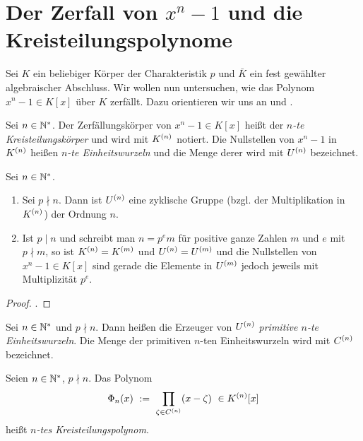 \chapter{Der Zerfall von $x^n-1$ und die Kreisteilungspolynome}
\label{chap:kreisteilungspolynome}

Sei $K$ ein beliebiger Körper der Charakteristik $p$ 
und $\bar K$ ein fest gewählter algebraischer
Abschluss. Wir wollen nun untersuchen, wie das Polynom
$x^n-1 \in K[x]$ über $K$ zerfällt. Dazu orientieren wir uns 
an \autocite{lidl1997finite} und \autocite{wan2003lectures}.

\begin{definition}
  \label{def:kreisteilungskorper}
  Sei $n\in\mathbb{N}^\ast$. Der Zerfällungskörper von $x^n-1 \in K[x]$ heißt
  der \emph{$n$-te Kreisteilungskörper} und wird mit $K^{(n)}$ notiert.
  Die Nullstellen von $x^n-1$ in $K^{(n)}$ heißen \emph{$n$-te
  Einheitswurzeln} und die Menge derer wird mit $U^{(n)}$ bezeichnet.
\end{definition}


\begin{satz}
  Sei $n\in \mathbb{N}^\ast$.
  \begin{enumerate}
    \item Sei $p\nmid n$. Dann ist $U^{(n)}$ eine zyklische Gruppe (bzgl. der
      Multiplikation in $K^{(n)}$) der Ordnung $n$.
    \item Ist $p \mid n$ und schreibt man $n = p^e m$ 
      für positive ganze Zahlen $m$ und $e$ mit $p\nmid m$, so
      ist $K^{(n)} = K^{(m)}$ und $U^{(n)}= U^{(m)}$ und die Nullstellen von
      $x^n-1 \in K[x]$ sind gerade die Elemente in $U^{(m)}$ jedoch jeweils mit
      Multiplizität $p^e$.
  \end{enumerate}
\end{satz}
\begin{proof}
  \autocite[Theorem 2.42]{lidl1997finite}.
\end{proof}


\begin{definition}
  \label{def:primitive_einheitswurzeln}
  Sei $n\in \mathbb{N}^\ast$ und $p\nmid n$. Dann heißen die Erzeuger von 
  $U^{(n)}$ \emph{primitive $n$-te Einheitswurzeln}. 
  Die Menge der primitiven $n$-ten Einheitswurzeln wird mit
  $C^{(n)}$ bezeichnet.
\end{definition}


\begin{definition}[Kreisteilungspolynom]
  \label{def:kreisteilungspolynom}
  Seien $n \in \mathbb{N}^\ast$, $p\nmid n$. Das Polynom 
  \[ \Phi_n(x) \ :=\  \prod_{\zeta \in C^{(n)}} (x - \zeta)\ \in 
    K^{(n)}[x]\]
  heißt \emph{$n$-tes Kreisteilungspolynom}.
\end{definition}


